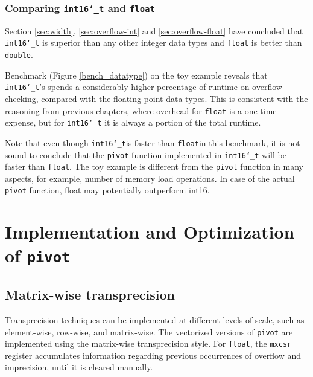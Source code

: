 \documentclass[logo,bsc,singlespacing,parskip]{infthesis}
\newcommand{\dtshort}{\texttt{int16\char`_t}}
\newcommand{\dtfloat}{\texttt{float}}
\newcommand{\dtdouble}{\texttt{double}}
\newcommand{\mxcsr}{\texttt{mxcsr}}
\newcommand{\pivot}{\texttt{pivot}}
\begin{document}
\subsection{Comparing \dtshort{} and \dtfloat{}}

Section \ref{sec:width}, \ref{sec:overflow-int} and \ref{sec:overflow-float}
have concluded that \dtshort{} is superior than any other integer data types and
\dtfloat{} is better than \dtdouble{}. 


Benchmark (Figure \ref{bench_datatype}) on the toy example reveals that
\dtshort{}'s spends a considerably higher percentage of runtime on overflow
checking, compared with the floating point data types. This is consistent with
the reasoning from previous chapters, where overhead for \dtfloat{} is a
one-time expense, but for \dtshort{} it is always a portion of the total
runtime. 

Note that even though \dtshort is faster than \dtfloat in this benchmark, it is
not sound to conclude that the \pivot{} function implemented in \dtshort
will be faster than \dtfloat. The toy example is different from the \pivot
function in many aspects, for example, number of memory load operations. In case
of the actual \pivot{} function, float may potentially outperform int16. 




\chapter{Implementation and Optimization of \pivot{}}

\section{Matrix-wise transprecision}
Transprecision techniques can be implemented at different levels of scale, such
as element-wise, row-wise, and matrix-wise. The vectorized versions of \pivot{}
are implemented using the matrix-wise transprecision style. For \dtfloat{},
the \mxcsr{} register accumulates information regarding previous occurrences of
overflow and imprecision, until it is cleared manually. 
\end{document}
